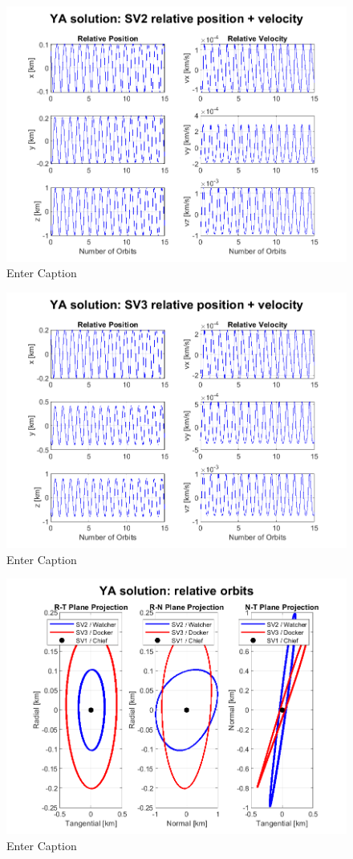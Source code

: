 \begin{figure}
    \centering
    \includegraphics[width=0.5\linewidth]{sim/figures/PS3/YA_pos_vel_SV2.png}
    \caption{Enter Caption}
    \label{fig:enter-label}
\end{figure}
\begin{figure}
    \centering
    \includegraphics[width=0.5\linewidth]{sim/figures/PS3/YA_pos_vel_SV3.png}
    \caption{Enter Caption}
    \label{fig:enter-label}
\end{figure}
\begin{figure}
    \centering
    \includegraphics[width=0.5\linewidth]{sim/figures/PS3/RTN_projections_YA.png}
    \caption{Enter Caption}
    \label{fig:enter-label}
\end{figure}